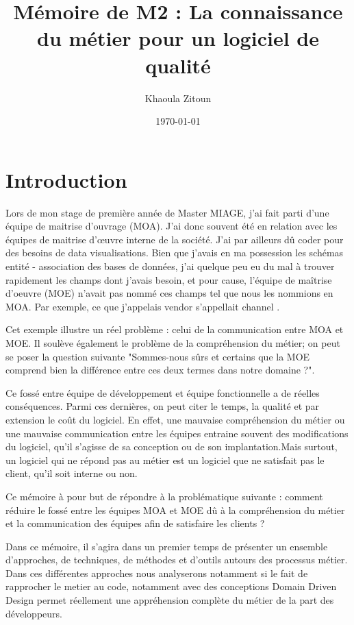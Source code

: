\documentclass[12pt]{article}
\title{Mémoire de M2 : La connaissance du métier pour un logiciel de qualité}
\author{Khaoula Zitoun}
\date{\today}
\begin{document}
\maketitle

\section{Introduction }

Lors de mon stage de première année de Master MIAGE, j’ai fait parti d’une équipe de maitrise d’ouvrage (MOA). J’ai donc souvent été en relation avec les équipes de maitrise d’œuvre interne de la société. J’ai par ailleurs dû coder pour des besoins de data visualisations. Bien que j’avais en ma possession les schémas entité - association des bases de données, j’ai quelque peu eu du mal à trouver rapidement les champs dont j’avais besoin, et pour cause, l’équipe de maîtrise d'oeuvre (MOE) n’avait pas nommé ces champs tel que nous les nommions en MOA. Par exemple, ce que j’appelais  \og vendor \fg  s’appellait \og channel \fg. 


Cet exemple illustre un réel problème :  celui de la communication entre MOA et MOE. Il soulève également le problème de la compréhension du métier; on peut se poser la question suivante "Sommes-nous sûrs et certains que la MOE comprend bien la différence entre ces deux termes dans notre domaine ?".


Ce fossé entre équipe de développement et équipe fonctionnelle a de réelles conséquences. Parmi ces dernières, on peut citer le temps, la qualité et par extension le coût du logiciel. En effet, une mauvaise compréhension du métier ou une mauvaise communication entre les équipes entraine souvent des modifications du logiciel, qu’il s’agisse de sa conception ou de son implantation.Mais surtout, un logiciel qui ne répond pas au métier est un logiciel que ne satisfait pas le client, qu’il soit interne ou non.

Ce mémoire à pour but de répondre à la problématique suivante : comment réduire le fossé entre les équipes MOA et MOE dû à la compréhension du métier et la communication des équipes afin de satisfaire les clients ? 

Dans ce mémoire, il s'agira dans un premier temps de présenter un ensemble d’approches, de techniques, de méthodes et d’outils autours des processus métier. Dans ces différentes approches nous analyserons notamment si le fait de rapprocher le metier au code, notamment avec des conceptions Domain Driven Design permet réellement une appréhension complète du métier de la part des développeurs.
\end{document}
